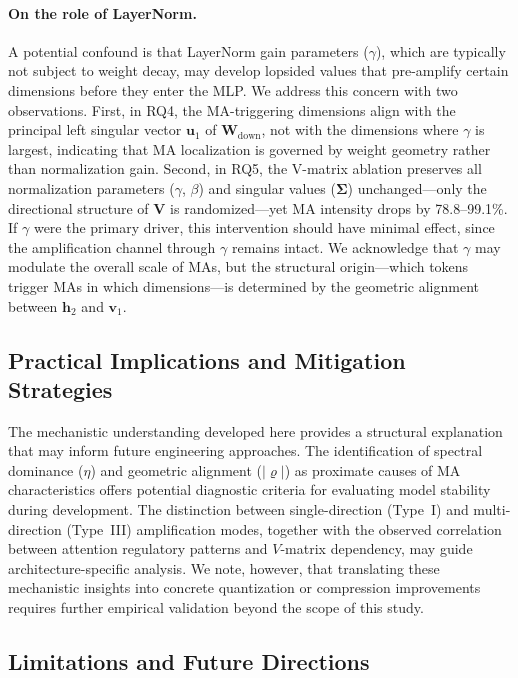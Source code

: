 \documentclass[conference]{IEEEtran}
\begin{document}
\paragraph{On the role of LayerNorm.} A potential confound is that LayerNorm gain parameters ($\gamma$), which are typically not subject to weight decay, may develop lopsided values that pre-amplify certain dimensions before they enter the MLP. We address this concern with two observations. First, in RQ4, the MA-triggering dimensions align with the principal left singular vector $\mathbf{u}_1$ of $\mathbf{W}_{\text{down}}$, not with the dimensions where $\gamma$ is largest, indicating that MA localization is governed by weight geometry rather than normalization gain. Second, in RQ5, the V-matrix ablation preserves all normalization parameters ($\gamma$, $\beta$) and singular values ($\boldsymbol{\Sigma}$) unchanged---only the directional structure of $\mathbf{V}$ is randomized---yet MA intensity drops by 78.8--99.1\%. If $\gamma$ were the primary driver, this intervention should have minimal effect, since the amplification channel through $\gamma$ remains intact. We acknowledge that $\gamma$ may modulate the overall scale of MAs, but the structural origin---which tokens trigger MAs in which dimensions---is determined by the geometric alignment between $\mathbf{h}_2$ and $\mathbf{v}_1$.

\subsection{Practical Implications and Mitigation Strategies}

The mechanistic understanding developed here provides a structural explanation that may inform future engineering approaches. The identification of spectral dominance ($\eta$) and geometric alignment ($|\varrho|$) as proximate causes of MA characteristics offers potential diagnostic criteria for evaluating model stability during development. The distinction between single-direction (Type~I) and multi-direction (Type~III) amplification modes, together with the observed correlation between attention regulatory patterns and $V$-matrix dependency, may guide architecture-specific analysis. We note, however, that translating these mechanistic insights into concrete quantization or compression improvements requires further empirical validation beyond the scope of this study.

\subsection{Limitations and Future Directions}
\end{document}
